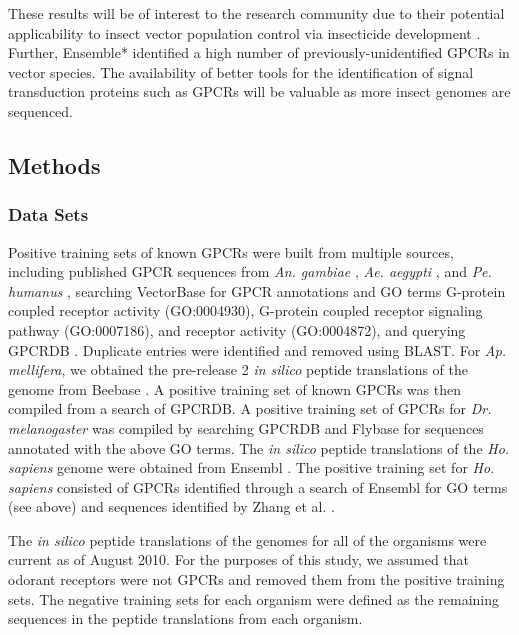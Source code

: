 These results will be of interest to the research community due to their potential applicability to insect vector population control via insecticide development \cite{Meyer2012}.  Further, Ensemble* identified a high number of previously-unidentified GPCRs in vector species.  The availability of better tools for the identification of signal transduction proteins such as GPCRs will be valuable as more insect genomes are sequenced.

\subsection{Methods}
	
\subsubsection{Data Sets}

Positive training sets of known GPCRs were built from multiple sources, including published GPCR sequences from \emph{An. gambiae} \cite{Hill2002, Holt2002},  \emph{Ae. aegypti} \cite{Nene2007}, and \emph{Pe. humanus} \cite{Kirkness2010}, searching VectorBase \cite{Lawson2007, Lawson2009} for GPCR annotations and GO terms G-protein coupled receptor activity (GO:0004930), G-protein coupled receptor signaling pathway (GO:0007186), and receptor activity (GO:0004872), and querying GPCRDB \cite{Horn2003,Vroling2011}. Duplicate entries were identified and removed using BLAST. For \emph{Ap. mellifera}, we obtained the pre-release 2 \emph{in silico} peptide translations of the genome from Beebase \cite{Munoz-Torres2011, Weinstock2006}.  A positive training set of known GPCRs was then compiled from a search of GPCRDB.  A positive training set of GPCRs for \emph{Dr. melanogaster} was compiled by searching GPCRDB and Flybase \cite{Adams2000, Gelbart1997, Crosby2007, Tweedie2009, McQuilton2011} for sequences annotated with the above GO terms.  The \textit{in silico} peptide translations of the \emph{Ho. sapiens} genome were obtained from Ensembl \cite{Hubbard2002}.  The positive training set for \emph{Ho. sapiens} consisted of GPCRs identified through a search of Ensembl for GO terms (see above) and sequences identified by Zhang et al. \cite{Zhang2006}.

The \textit{in silico} peptide translations of the genomes for all of the organisms were current as of August 2010.  For the purposes of this study, we assumed that odorant receptors were not GPCRs \cite{Sato2008, Touhara2009, Wicher2008} and removed them from the positive training sets.  The negative training sets for each organism were defined as the remaining sequences in the peptide translations from each organism.


